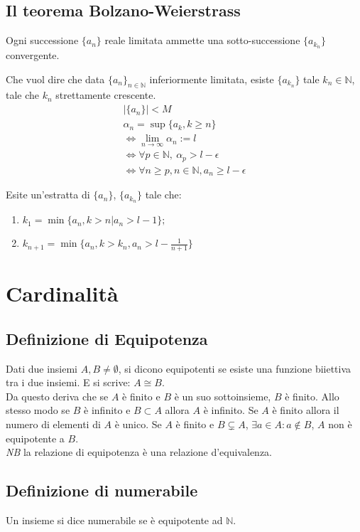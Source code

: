 \documentclass{article}
\begin{document}
\subsection{\textbf{Il teorema Bolzano-Weierstrass}}\label{bolzanoweierstrass}
Ogni successione $\{a_n\}$ reale limitata ammette una sotto-successione $\{a_{k_n}\}$ convergente.
\begin{dimostrazione}
	Che vuol dire che data $ \{a_n\}_{n \in \mathbb{N} }$ inferiormente limitata, esiste $ \{a_{k_n}\}$  tale $k_n \in \mathbb{N}$, tale che $k_n$ strettamente crescente.
	\begin{align*}
		|\{a_n\}|<M \\
 		\alpha_n=\sup\{a_k, k\geq n\}\\
		\iff \lim_{n \to \infty}\alpha_n:=l\\
		\iff \forall p \in \mathbb{N},\ \alpha_p> l-\epsilon\\
		\iff \forall n \geq p, n \in \mathbb{N}, a_n \geq l- \epsilon
	\end{align*}

	Esite un'estratta di $\{a_n\}$, $\{a_{k_n}\}$ tale che:
		\begin{enumerate}
			\item $ k_1=\min\{a_n,k>n|a_n>l-1\};$
			\item $ k_{n+1}=\min\{a_n, k>k_n, a_n>l-\frac{1}{n+1}\}$
		\end{enumerate}
	\end{dimostrazione}

\section{Cardinalità}
\subsection{Definizione di Equipotenza}
Dati due insiemi $A, B \neq \emptyset $, si dicono equipotenti se esiste una funzione biiettiva tra i due insiemi. E si scrive: $A \cong B$. \\
Da questo deriva che se $A$ è finito e $B$ è un suo sottoinsieme, $B$ è finito.
Allo stesso modo se $B$ è infinito e $B \subset A$ allora $A$ è infinito. Se $A$ è finito allora il numero di elementi di $A$ è unico. Se $A$ è finito e $ B \subsetneq A$, $\exists a \in A:a \notin B$, $A$ non è equipotente a $B$. \\
\textit{NB} la relazione di equipotenza è una relazione d'equivalenza.

\subsection{Definizione di numerabile}
Un insieme si dice numerabile se è equipotente ad $ \mathbb{N}$.\\
\end{document}
